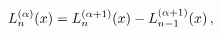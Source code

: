 \[\mathop{L^{(\alpha)}_{n}\/}\nolimits\!\left(x\right)=\mathop{L^{(\alpha+1)}_{n%
}\/}\nolimits\!\left(x\right)-\mathop{L^{(\alpha+1)}_{n-1}\/}\nolimits\!\left(%
x\right),\]